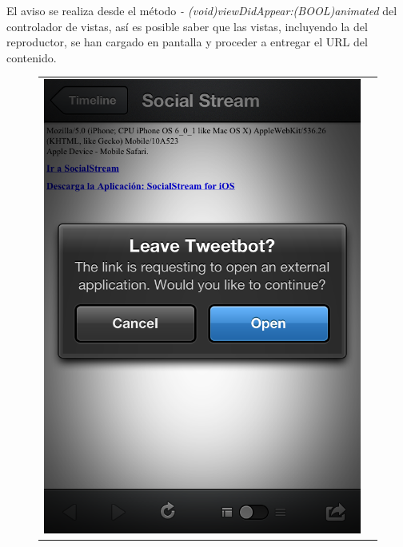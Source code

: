 El aviso se realiza desde el método \textit{- (void)viewDidAppear:(BOOL)animated} del controlador de vistas, así es posible saber que las vistas, incluyendo la del reproductor, se han cargado en pantalla y proceder a entregar el URL del contenido.



\begin{figure}[H]
	\centering
	\begin{tabular}{cc}
	\includegraphics[scale=0.3]{imgs/tweetbot-sstream.png} &

\end{tabular}
\end{figure}
